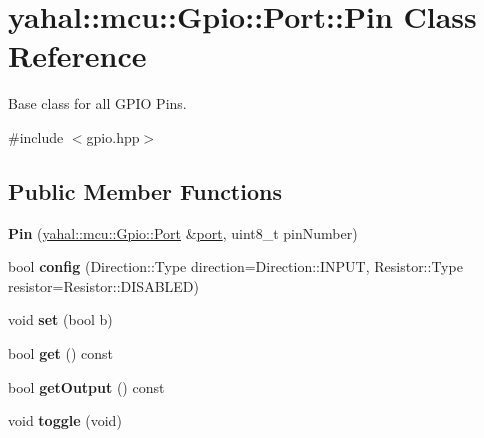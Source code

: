 \hypertarget{classyahal_1_1mcu_1_1_gpio_1_1_port_1_1_pin}{}\section{yahal\+:\+:mcu\+:\+:Gpio\+:\+:Port\+:\+:Pin Class Reference}
\label{classyahal_1_1mcu_1_1_gpio_1_1_port_1_1_pin}


Base class for all G\+P\+I\+O Pins.  




{\ttfamily \#include $<$gpio.\+hpp$>$}

\subsection*{Public Member Functions}
\begin{DoxyCompactItemize}
\item 
\hypertarget{classyahal_1_1mcu_1_1_gpio_1_1_port_1_1_pin_a7222a8a899df5f52afb9f051ff37600f}{}{\bfseries Pin} (\hyperlink{classyahal_1_1mcu_1_1_gpio_1_1_port}{yahal\+::mcu\+::\+Gpio\+::\+Port} \&\hyperlink{classyahal_1_1mcu_1_1_gpio_ae479c2a3403911b60310bf0c57594dcd}{port}, uint8\+\_\+t pin\+Number)\label{classyahal_1_1mcu_1_1_gpio_1_1_port_1_1_pin_a7222a8a899df5f52afb9f051ff37600f}

\item 
\hypertarget{classyahal_1_1mcu_1_1_gpio_1_1_port_1_1_pin_aa14906a4f396defe53795836c79bb522}{}bool {\bfseries config} (Direction\+::\+Type direction=Direction\+::\+I\+N\+P\+U\+T, Resistor\+::\+Type resistor=Resistor\+::\+D\+I\+S\+A\+B\+L\+E\+D)\label{classyahal_1_1mcu_1_1_gpio_1_1_port_1_1_pin_aa14906a4f396defe53795836c79bb522}

\item 
\hypertarget{classyahal_1_1mcu_1_1_gpio_1_1_port_1_1_pin_aa85e73ccf2321a3677f726d9cd26ba6e}{}void {\bfseries set} (bool b)\label{classyahal_1_1mcu_1_1_gpio_1_1_port_1_1_pin_aa85e73ccf2321a3677f726d9cd26ba6e}

\item 
\hypertarget{classyahal_1_1mcu_1_1_gpio_1_1_port_1_1_pin_a2e61bdd78fb21e0fafd57467547d2492}{}bool {\bfseries get} () const \label{classyahal_1_1mcu_1_1_gpio_1_1_port_1_1_pin_a2e61bdd78fb21e0fafd57467547d2492}

\item 
\hypertarget{classyahal_1_1mcu_1_1_gpio_1_1_port_1_1_pin_a217d8e25f291766274f42706583d4cd1}{}bool {\bfseries get\+Output} () const \label{classyahal_1_1mcu_1_1_gpio_1_1_port_1_1_pin_a217d8e25f291766274f42706583d4cd1}

\item 
\hypertarget{classyahal_1_1mcu_1_1_gpio_1_1_port_1_1_pin_a56aec5c48c03afb52211da1d55a5f400}{}void {\bfseries toggle} (void)\label{classyahal_1_1mcu_1_1_gpio_1_1_port_1_1_pin_a56aec5c48c03afb52211da1d55a5f400}

\end{DoxyCompactItemize}


